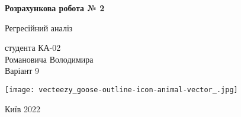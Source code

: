 \documentclass[12 pt]{article}
\begin{document}
\begin{titlepage}
    \begin{center}
        \vspace*{1cm}
            
        \Huge
        \textbf{Розрахункова робота № 2}
            
        \vspace{0.5cm}
        \LARGE
        Регресійний аналіз
            
        \vspace{1.5cm}
            
            
        \vfill
        студента КА-02\\
        Романовича Володимира \\ 
        Варіант 9
        \vspace{0.8cm}
            
        \texttt{[image: vecteezy\_goose-outline-icon-animal-vector\_.jpg]}
            
        \Large
        Київ 2022
            
    \end{center}
\end{titlepage}
\end{document}
